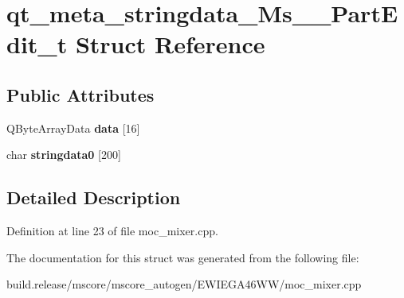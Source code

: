 \hypertarget{structqt__meta__stringdata___ms_____part_edit__t}{}\section{qt\+\_\+meta\+\_\+stringdata\+\_\+\+Ms\+\_\+\+\_\+\+Part\+Edit\+\_\+t Struct Reference}
\label{structqt__meta__stringdata___ms_____part_edit__t}
\subsection*{Public Attributes}
\begin{DoxyCompactItemize}
\item 
\mbox{\label{structqt__meta__stringdata___ms_____part_edit__t_ad24ae2452290bc55928c9fe4a49c0f28}} 
Q\+Byte\+Array\+Data {\bfseries data} \mbox{[}16\mbox{]}
\item 
\mbox{\label{structqt__meta__stringdata___ms_____part_edit__t_aa2222ef27b9671a5775f54128fdbc2cb}} 
char {\bfseries stringdata0} \mbox{[}200\mbox{]}
\end{DoxyCompactItemize}


\subsection{Detailed Description}


Definition at line 23 of file moc\+\_\+mixer.\+cpp.



The documentation for this struct was generated from the following file\+:\begin{DoxyCompactItemize}
\item 
build.\+release/mscore/mscore\+\_\+autogen/\+E\+W\+I\+E\+G\+A46\+W\+W/moc\+\_\+mixer.\+cpp\end{DoxyCompactItemize}
